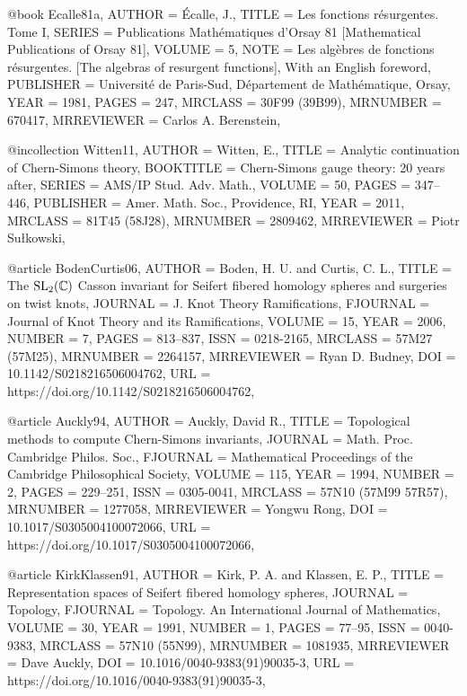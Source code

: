 @book {Ecalle81a,
    AUTHOR = {\'{E}calle, J.},
     TITLE = {Les fonctions r\'{e}surgentes. {T}ome {I}},
    SERIES = {Publications Math\'{e}matiques d'Orsay 81 [Mathematical
              Publications of Orsay 81]},
    VOLUME = {5},
      NOTE = {Les alg\`ebres de fonctions r\'{e}surgentes. [The algebras of
              resurgent functions],
              With an English foreword},
 PUBLISHER = {Universit\'{e} de Paris-Sud, D\'{e}partement de Math\'{e}matique, Orsay},
      YEAR = {1981},
     PAGES = {247},
   MRCLASS = {30F99 (39B99)},
  MRNUMBER = {670417},
MRREVIEWER = {Carlos A. Berenstein},
}

@incollection {Witten11,
    AUTHOR = {Witten, E.},
     TITLE = {Analytic continuation of {C}hern-{S}imons theory},
 BOOKTITLE = {Chern-{S}imons gauge theory: 20 years after},
    SERIES = {AMS/IP Stud. Adv. Math.},
    VOLUME = {50},
     PAGES = {347--446},
 PUBLISHER = {Amer. Math. Soc., Providence, RI},
      YEAR = {2011},
   MRCLASS = {81T45 (58J28)},
  MRNUMBER = {2809462},
MRREVIEWER = {Piotr Su\l kowski},
}

@article {BodenCurtis06,
    AUTHOR = {Boden, H. U. and Curtis, C. L.},
     TITLE = {The {$\text{SL}_2(\Bbb C)$} {C}asson invariant for {S}eifert
              fibered homology spheres and surgeries on twist knots},
   JOURNAL = {J. Knot Theory Ramifications},
  FJOURNAL = {Journal of Knot Theory and its Ramifications},
    VOLUME = {15},
      YEAR = {2006},
    NUMBER = {7},
     PAGES = {813--837},
      ISSN = {0218-2165},
   MRCLASS = {57M27 (57M25)},
  MRNUMBER = {2264157},
MRREVIEWER = {Ryan D. Budney},
       DOI = {10.1142/S0218216506004762},
       URL = {https://doi.org/10.1142/S0218216506004762},
}

@article {Auckly94,
    AUTHOR = {Auckly, David R.},
     TITLE = {Topological methods to compute {C}hern-{S}imons invariants},
   JOURNAL = {Math. Proc. Cambridge Philos. Soc.},
  FJOURNAL = {Mathematical Proceedings of the Cambridge Philosophical
              Society},
    VOLUME = {115},
      YEAR = {1994},
    NUMBER = {2},
     PAGES = {229--251},
      ISSN = {0305-0041},
   MRCLASS = {57N10 (57M99 57R57)},
  MRNUMBER = {1277058},
MRREVIEWER = {Yongwu Rong},
       DOI = {10.1017/S0305004100072066},
       URL = {https://doi.org/10.1017/S0305004100072066},
}

@article {KirkKlassen91,
    AUTHOR = {Kirk, P. A. and Klassen, E. P.},
     TITLE = {Representation spaces of {S}eifert fibered homology spheres},
   JOURNAL = {Topology},
  FJOURNAL = {Topology. An International Journal of Mathematics},
    VOLUME = {30},
      YEAR = {1991},
    NUMBER = {1},
     PAGES = {77--95},
      ISSN = {0040-9383},
   MRCLASS = {57N10 (55N99)},
  MRNUMBER = {1081935},
MRREVIEWER = {Dave Auckly},
       DOI = {10.1016/0040-9383(91)90035-3},
       URL = {https://doi.org/10.1016/0040-9383(91)90035-3},
}

